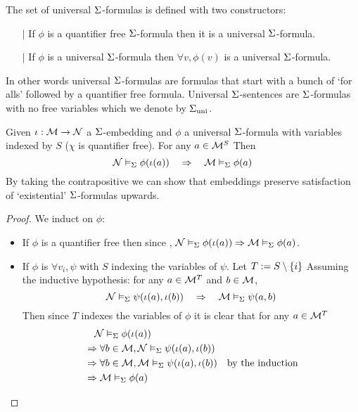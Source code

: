 \begin{dfn}
    The set of universal $\Sigma$-formulas
    is defined with two constructors:
    \begin{itemize}
        \item[$\vert$] If $\phi$ is a quantifier free $\Sigma$-formula 
        then it is a universal $\Sigma$-formula.
        \item[$\vert$] If $\phi$ is a universal $\Sigma$-formula then
        $\forall v, \phi(v)$ is a universal $\Sigma$-formula.
    \end{itemize}
    In other words universal $\Sigma$-formulas are formulas that start with 
    a bunch of `for alls' followed by a quantifier free formula.
    Universal $\Sigma$-sentences are $\Sigma$-formulas with no free variables
    which we denote by ${\Sigma}_\mathrm{uni}$.
\end{dfn}

\begin{prop}
    Given $\iota : \mathcal{M} \to \mathcal{N}$ a $\Sigma$-embedding and
    $\phi$ a universal $\Sigma$-formula with 
    variables indexed by $S$ ($\chi$ is quantifier free).
    For any $a \in \mathcal{M}^S$
    Then 
    \[
        \mathcal{N} \vDash_{\Sigma} \phi(\iota(a)) \quad \Rightarrow \quad
        \mathcal{M} \vDash_{\Sigma} \phi(a)
    \]
    By taking the contrapositive we can show that embeddings
    preserve satisfaction of `existential' $\Sigma$-formulas upwards.
\end{prop}
\begin{proof}
    We induct on $\phi$:
    \begin{itemize}
        \item If $\phi$ is a quantifier free then since 
        , 
        $\mathcal{N} \vDash_{\Sigma} \phi(\iota(a)) \Rightarrow
        \mathcal{M} \vDash_{\Sigma} \phi(a)$.
        \item If $\phi$ is $\forall v_i, \psi$ with $S$ indexing the variables
        of $\psi$. 
        Let $T := S \setminus \left\{i\right\}$
        Assuming the inductive hypothesis: 
        for any $a \in {\mathcal{M}}^T$ and 
        $b \in {\mathcal{M}}$,
        \[\mathcal{N} \vDash_{\Sigma} \psi(\iota(a),\iota(b)) \quad \Rightarrow \quad
        \mathcal{M} \vDash_{\Sigma} \psi(a,b)\]
        Then since $T$ indexes the variables of $\phi$ it is clear that
        for any $a \in {\mathcal{M}}^T$
        \begin{align*}
            &\quad \mathcal{N} \vDash_{\Sigma} \phi(\iota(a))\\
            &\Rightarrow \forall b \in {\mathcal{M}}, 
            \mathcal{N} \vDash_{\Sigma} \psi(\iota(a),\iota(b)) \\
            &\Rightarrow \forall b \in {\mathcal{M}}, 
            \mathcal{M} \vDash_{\Sigma} \psi(\iota(a),\iota(b)) & \text{by the induction}\\
            &\Rightarrow \mathcal{M} \vDash_{\Sigma} \phi(a)
        \end{align*}
    \end{itemize}
\end{proof}


